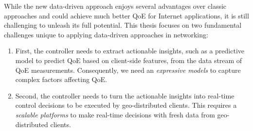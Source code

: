 %
%
%
%

While the new data-driven approach enjoys several advantages over 
classic approaches and could achieve much better QoE for Internet 
applications, it is still challenging to unleash its full potential.
This thesis focuses on two fundamental challenges unique to applying 
data-driven approaches in networking:

\begin{enumerate}

\item 
First, the controller needs to extract actionable insights, such as a 
predictive model to predict QoE based on client-side features, from 
the data stream of QoE measurements. 
Consequently, we need an {\em expressive models} to capture complex 
factors affecting QoE. 

\item 
Second, the controller needs to turn the actionable insights into 
real-time control decisions to be executed by geo-distributed clients. 
This requires a {\em scalable platforms} to make real-time decisions 
with fresh data from geo-distributed clients.

\end{enumerate}

